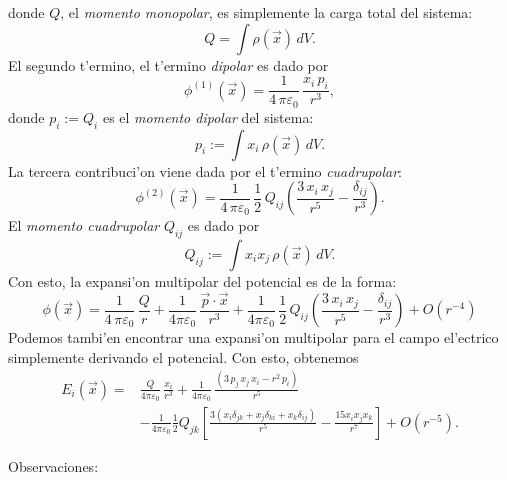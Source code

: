 donde $Q$, el \textit{momento monopolar}, es simplemente la carga total del sistema:
\begin{equation} \label{eq3.2.6}
Q=\int \rho(\vec{x})\,dV.
\end{equation}
El segundo t'ermino, el t'ermino {\em dipolar} es dado por
\begin{equation}
\phi^{(1)}(\vec{x}) =\frac{1}{4\,\pi\varepsilon_0}\,\frac{x_i\,p_i}{r^3},
\end{equation}
donde $p_i:=Q_i$ es el \textit{momento dipolar} del sistema:
\begin{equation} \label{eq3.2.8}
p_i:=\int x_i\,\rho(\vec{x})\,dV.
\end{equation}
La tercera contribuci'on viene dada por el t'ermino {\em cuadrupolar}:
\begin{equation} \label{eq3.2.9}
\phi^{(2)}(\vec{x})=\frac{1}{4\,\pi\varepsilon_0}\,\frac{1}{2}\,Q_{ij}
\left(\frac{3\,x_i\,x_j}{r^5}-\frac{\delta_{ij}}{r^3}\right).
\end{equation}
El \textit{momento cuadrupolar} $Q_{ij}$ es dado por
\begin{equation}
Q_{ij}:=\int x_ix_j\,\rho(\vec{x})\,dV. \label{mom4}
\end{equation}
Con esto, la expansi'on multipolar del potencial es de la forma:
\begin{equation} \label{eq3.2.12}
\boxed{\phi(\vec{x})=\frac{1}{4\,\pi\varepsilon_0}\,\frac{Q}{r}+
\frac{1}{4\pi\varepsilon_0}\,\frac{\vec{p}\cdot\vec{x}}{r^3}+
\frac{1}{4\pi\varepsilon_0}\,\frac{1}{2}\,Q_{ij}\left(\frac{3\,x_i\,x_j}{
r^5}-\frac{\delta_{ij}}{r^3}\right)+O(r^{-4})}
\end{equation}
Podemos tambi'en encontrar una expansi'on multipolar para el campo el'ectrico
simplemente derivando el potencial. Con esto, obtenemos
\begin{align} \label{eq3.2.12.1}
E_i(\vec{x}) =& \frac{Q}{4\pi\varepsilon_0}\,\frac{x_i}{r^3}+\frac{1}{
4\pi\varepsilon_0}\,\frac{(3\,p_j\,x_j\,x_i-r^2\,p_i)}{r^5} \nonumber\\
& - \frac{1}{4\pi\varepsilon_0}\frac{1}{2}Q_{jk}\left[
\frac{3\left(x_i\delta_{jk}+x_j\delta_{ki}+x_k\delta_{ij}\right)}{r^5}
-\frac{15x_ix_jx_k}{r^7}\right]
+O(r^{-5}) .
\end{align}

Observaciones:

